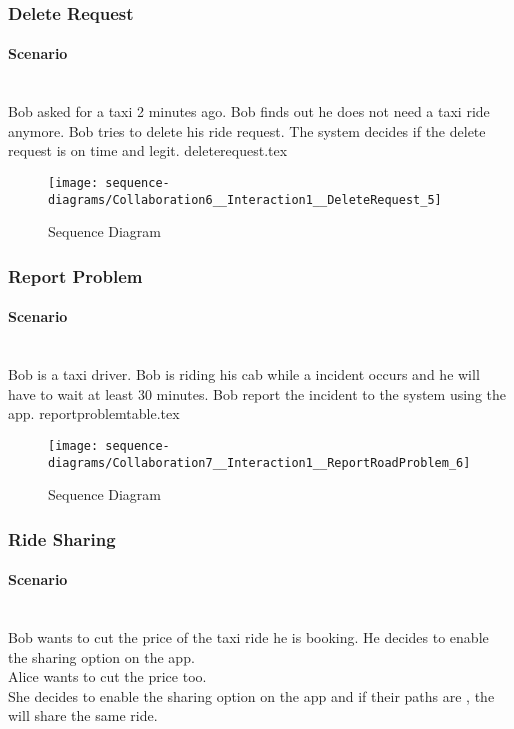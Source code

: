 \subsubsection{Delete Request} 
\label{ssub:deleterequest_scenario}
\paragraph{Scenario} \hfill \\
Bob asked for a taxi 2 minutes ago. Bob finds out he does not need a taxi ride anymore. Bob tries to delete his ride request. The system decides if the delete request is on time and legit.
{deleterequest.tex}
\newpage
\vfill
\begin{figure}
\caption{Sequence Diagram}
\texttt{[image: sequence-diagrams/Collaboration6\_\_Interaction1\_\_DeleteRequest\_5]}
\centering
\end{figure}
\vfill
\clearpage

\subsubsection{Report Problem} 
\label{ssub:reportproblem_scenario}
\paragraph{Scenario} \hfill \\
Bob is a taxi driver. Bob is riding his cab while a incident occurs and he will have to wait at least 30 minutes. Bob report the incident to the system using the app.
{reportproblemtable.tex}
\newpage
\vfill
\begin{figure}
\caption{Sequence Diagram}
\texttt{[image: sequence-diagrams/Collaboration7\_\_Interaction1\_\_ReportRoadProblem\_6]}
\centering
\end{figure}
\vfill
\clearpage

\subsubsection{Ride Sharing} 
\label{ssub:ridesharing_scenario}
\paragraph{Scenario} \hfill \\
Bob wants to cut the price of the taxi ride he is booking. He decides to enable the sharing option on the app.\\
Alice wants to cut the price too.\\
She decides to enable the sharing option on the app and if their paths are \emph{} , the will share the same ride.

